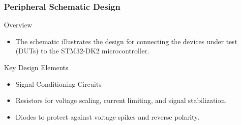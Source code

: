 \documentclass[8pt,compress]{beamer}
\begin{document}

\begin{frame}
  \frametitle{Peripheral Schematic Design}
  \begin{block}{Overview}
    \begin{itemize}
      \item The schematic illustrates the design for connecting the devices under test (DUTs) to the STM32-DK2 microcontroller.
    \end{itemize}
  \end{block}
  \begin{block}{Key Design Elements}
    \begin{itemize}
      \item Signal Conditioning Circuits
      \item Resistors for voltage scaling, current limiting, and signal stabilization.
      \item Diodes to protect against voltage spikes and reverse polarity.
    \end{itemize}
  \end{block}
\end{frame}
\end{document}
